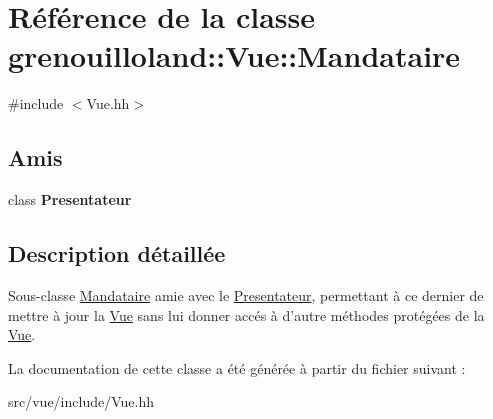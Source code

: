 \hypertarget{classgrenouilloland_1_1Vue_1_1Mandataire}{\section{Référence de la classe grenouilloland\-:\-:Vue\-:\-:Mandataire}
\label{classgrenouilloland_1_1Vue_1_1Mandataire}
}


{\ttfamily \#include $<$Vue.\-hh$>$}

\subsection*{Amis}
\begin{DoxyCompactItemize}
\item 
\hypertarget{classgrenouilloland_1_1Vue_1_1Mandataire_afe4b621cff2b09f0856344dc3675efd4}{class {\bfseries Presentateur}}\label{classgrenouilloland_1_1Vue_1_1Mandataire_afe4b621cff2b09f0856344dc3675efd4}

\end{DoxyCompactItemize}


\subsection{Description détaillée}
Sous-\/classe \hyperlink{classgrenouilloland_1_1Vue_1_1Mandataire}{Mandataire} amie avec le \hyperlink{classgrenouilloland_1_1Presentateur}{Presentateur}, permettant à ce dernier de mettre à jour la \hyperlink{classgrenouilloland_1_1Vue}{Vue} sans lui donner accés à d'autre méthodes protégées de la \hyperlink{classgrenouilloland_1_1Vue}{Vue}. 

La documentation de cette classe a été générée à partir du fichier suivant \-:\begin{DoxyCompactItemize}
\item 
src/vue/include/Vue.\-hh\end{DoxyCompactItemize}
